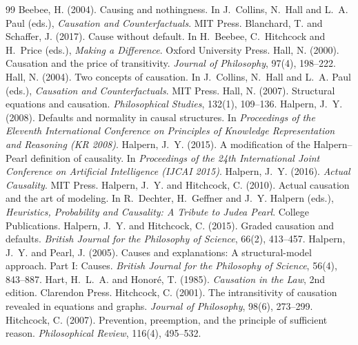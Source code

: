 \documentclass{situationist-preprint}
\begin{document}
\begin{thebibliography}{99}\small
{} Beebee, H. (2004). Causing and nothingness. In J.~Collins, N.~Hall and L.~A. Paul (eds.), \emph{Causation and Counterfactuals}. MIT Press.
 Blanchard, T. and Schaffer, J. (2017). Cause without default. In H.~Beebee, C.~Hitchcock and H.~Price (eds.), \emph{Making a Difference}. Oxford University Press.
 Hall, N. (2000). Causation and the price of transitivity. \emph{Journal of Philosophy}, 97(4), 198--222.
 Hall, N. (2004). Two concepts of causation. In J.~Collins, N.~Hall and L.~A. Paul (eds.), \emph{Causation and Counterfactuals}. MIT Press.
 Hall, N. (2007). Structural equations and causation. \emph{Philosophical Studies}, 132(1), 109--136.
 Halpern, J.~Y. (2008). Defaults and normality in causal structures. In \emph{Proceedings of the Eleventh International Conference on Principles of Knowledge Representation and Reasoning (KR 2008)}.
 Halpern, J.~Y. (2015). A modification of the Halpern--Pearl definition of causality. In \emph{Proceedings of the 24th International Joint Conference on Artificial Intelligence (IJCAI 2015)}.
 Halpern, J.~Y. (2016). \emph{Actual Causality}. MIT Press.
 Halpern, J.~Y. and Hitchcock, C. (2010). Actual causation and the art of modeling. In R.~Dechter, H.~Geffner and J.~Y. Halpern (eds.), \emph{Heuristics, Probability and Causality: A Tribute to Judea Pearl}. College Publications.
 Halpern, J.~Y. and Hitchcock, C. (2015). Graded causation and defaults. \emph{British Journal for the Philosophy of Science}, 66(2), 413--457.
 Halpern, J.~Y. and Pearl, J. (2005). Causes and explanations: A structural-model approach. Part I: Causes. \emph{British Journal for the Philosophy of Science}, 56(4), 843--887.
 Hart, H.~L.~A. and Honor\'e, T. (1985). \emph{Causation in the Law}, 2nd edition. Clarendon Press.
 Hitchcock, C. (2001). The intransitivity of causation revealed in equations and graphs. \emph{Journal of Philosophy}, 98(6), 273--299.
 Hitchcock, C. (2007). Prevention, preemption, and the principle of sufficient reason. \emph{Philosophical Review}, 116(4), 495--532.

\end{thebibliography}
\end{document}
